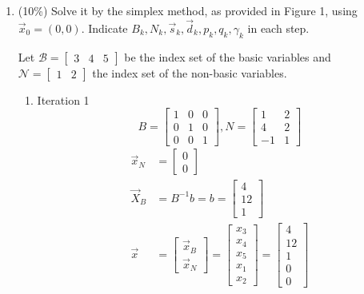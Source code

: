 \documentclass[a4paper,10pt]{article}
\begin{document}
\begin{enumerate}
\begin{enumerate}
        \item (10\%) Solve it by the simplex method, as provided in Figure 1, using $\vec{x}_0 = (0, 0)$.
        Indicate $B_k, N_k, \vec{s}_k, \vec{d}_k, p_k, q_k, \gamma_k$ in each step.\
        
        {\color{blue} 
            Let $\mathcal{B} = \begin{bmatrix} 3 & 4 & 5 \end{bmatrix}$ be the index set of the basic variables and $\mathcal{N} = \begin{bmatrix} 1 & 2 \end{bmatrix}$ the index set of the non-basic variables.
            \begin{enumerate}
                \item Iteration 1
                    \[ B = \begin{bmatrix}1 & 0 & 0 \\ 0 & 1 & 0 \\ 0 & 0 & 1\end{bmatrix}, N =  \begin{bmatrix}1 & 2 \\ 4 & 2 \\ -1 & 1 \end{bmatrix}\]
                    \begin{align}
                        \vec{x}_N &= \begin{bmatrix} 0 \\ 0 \end{bmatrix} \\
                        \vec{X}_B &= B^{-1}b = b = \begin{bmatrix} 4 \\ 12 \\ 1 \end{bmatrix} \\
                        \vec{x} &= \begin{bmatrix} \vec{x}_B \\ \vec{x}_N \end{bmatrix}
                        = \begin{bmatrix} x_3 \\ x_4 \\ x_5 \\ x_1 \\ x_2 \end{bmatrix} 
                        = \begin{bmatrix} 4 \\ 12 \\ 1 \\ 0 \\ 0 \end{bmatrix} 
                    \end{align}


\end{enumerate}}
\end{enumerate}
\end{enumerate}
\end{document}
